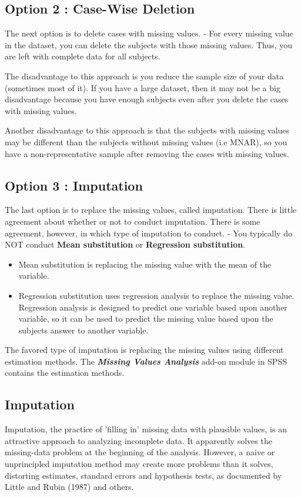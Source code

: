 \documentclass[12pt]{article} %
\begin{document}
\subsection{Option 2 : Case-Wise Deletion}
The next option is to delete cases with missing values.  - For every missing value in the dataset, you can delete the subjects with those missing values. Thus, you are left with complete data for all subjects.

The disadvantage to this approach is you reduce the sample size of your data (sometimes most of it). If you have a large dataset, then it may not be a big disadvantage because you have enough subjects even after you delete the cases with missing values.

Another disadvantage to this approach is that the subjects with missing values may be different than the subjects without missing values (i.e MNAR), so you have a non-representative sample after removing the cases with missing values.

\subsection{Option 3 : Imputation}
The last option is to replace the missing values, called imputation. There is little agreement about whether or not to conduct imputation. There is some agreement, however, in which type of imputation to conduct.  - You typically do NOT conduct \textbf{Mean substitution} or \textbf{Regression substitution}.

\begin{itemize}
\item Mean substitution is replacing the missing value with the mean of the variable.
\item Regression substitution uses regression analysis to replace the missing value. Regression analysis is designed to predict one variable based upon another variable, so it can be used to predict the missing value based upon the subjects answer to another variable.

\end{itemize}

The favored type of imputation is replacing the missing values using different estimation methods. The \textbf{\textit{Missing Values Analysis}} add-on module in SPSS contains the estimation methods.

\subsection{Imputation}
Imputation, the practice of 'filling in' missing data with plausible values, is an attractive approach to analyzing incomplete data. It apparently solves the missing-data problem at the beginning of the analysis. However, a naive or unprincipled imputation method may create more problems than it solves, distorting estimates, standard errors and hypothesis tests, as documented by Little and Rubin (1987) and others.
\end{document}
